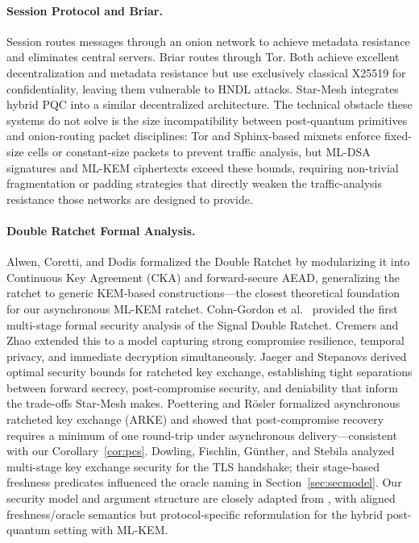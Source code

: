 \documentclass[11pt,a4paper]{article}
\theoremstyle{remark}
\theoremstyle{plain}
\begin{document}
\paragraph{Session Protocol and Briar.}
Session \cite{session_protocol} routes messages through an onion network to achieve metadata
resistance and eliminates central servers.  Briar \cite{briar_design} routes through Tor.  Both
achieve excellent decentralization and metadata resistance but use exclusively classical X25519
for confidentiality, leaving them vulnerable to HNDL attacks.  Star-Mesh integrates hybrid PQC
into a similar decentralized architecture.
The technical obstacle these systems do not solve is the size incompatibility between
post-quantum primitives and onion-routing packet disciplines: Tor and Sphinx-based mixnets
enforce fixed-size cells or constant-size packets to prevent traffic analysis, but ML-DSA
signatures and ML-KEM ciphertexts exceed these bounds, requiring non-trivial fragmentation or
padding strategies that directly weaken the traffic-analysis resistance those networks are
designed to provide.

\paragraph{Double Ratchet Formal Analysis.}
Alwen, Coretti, and Dodis \cite{alwen2019doubleratchet} formalized the Double Ratchet by modularizing it into Continuous Key Agreement (CKA) and forward-secure AEAD, generalizing the ratchet to generic KEM-based constructions---the closest theoretical foundation for our asynchronous ML-KEM ratchet.
Cohn-Gordon et al.\ \cite{cohngordon2016} provided the first multi-stage formal security analysis of the
Signal Double Ratchet.  Cremers and Zhao \cite{cremers2024ratchet} extended this to a model capturing strong
compromise resilience, temporal privacy, and immediate decryption simultaneously.
Jaeger and Stepanovs \cite{jaeger2018optimal} derived optimal security bounds for ratcheted
key exchange, establishing tight separations between forward secrecy, post-compromise security,
and deniability that inform the trade-offs Star-Mesh makes.
Poettering and R\"osler \cite{poettering2018asynchronous} formalized asynchronous ratcheted key
exchange (ARKE) and showed that post-compromise recovery requires a minimum of one round-trip
under asynchronous delivery---consistent with our Corollary~\ref{cor:pcs}.
Dowling, Fischlin, G\"unther, and Stebila \cite{dowling2015multi} analyzed multi-stage key exchange
security for the TLS handshake; their stage-based freshness predicates influenced the
oracle naming in Section~\ref{sec:secmodel}.
Our security model and argument structure are closely adapted from
\cite{cohngordon2016,cremers2024ratchet}, with aligned freshness/oracle semantics but
protocol-specific reformulation for the hybrid post-quantum setting with ML-KEM.
\end{document}
